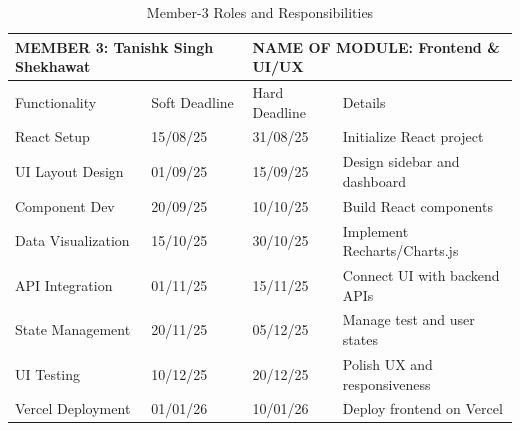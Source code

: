 \begin{table}[H]
\centering
\caption{Member-3 Roles and Responsibilities}
\begin{tabular}{|p{4cm}|p{2.5cm}|p{2.5cm}|p{5cm}|}
\hline
\multicolumn{2}{|l|}{MEMBER 3: Tanishk Singh Shekhawat} &
\multicolumn{2}{|l|}{NAME OF MODULE: Frontend \& UI/UX} \\
\hline
Functionality & Soft Deadline & Hard Deadline & Details \\
\hline
React Setup & 15/08/25 & 31/08/25 & Initialize React project \\
\hline
UI Layout Design & 01/09/25 & 15/09/25 & Design sidebar and dashboard \\
\hline
Component Dev & 20/09/25 & 10/10/25 & Build React components \\
\hline
Data Visualization & 15/10/25 & 30/10/25 & Implement Recharts/Charts.js \\
\hline
API Integration & 01/11/25 & 15/11/25 & Connect UI with backend APIs \\
\hline
State Management & 20/11/25 & 05/12/25 & Manage test and user states \\
\hline
UI Testing & 10/12/25 & 20/12/25 & Polish UX and responsiveness \\
\hline
Vercel Deployment & 01/01/26 & 10/01/26 & Deploy frontend on Vercel \\
\hline
\end{tabular}

\end{table}
